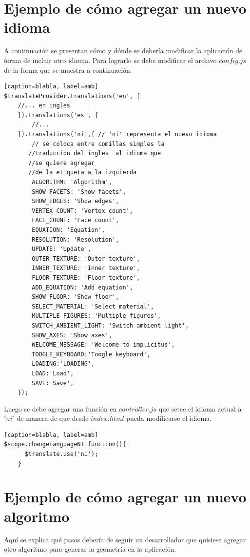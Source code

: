 \documentclass[12pt]{article}
\begin{document}
\section{Ejemplo de cómo agregar un nuevo idioma}
A continuación se presentan cómo y dónde se debería modificar la aplicación de forma de incluir otro idioma. 
Para lograrlo se debe modificar el archivo $config.js$ de la forma que se muestra a continuación.
\begin{lstlisting}[frame=single][caption=blabla, label=amb]
$translateProvider.translations('en', {
   	//... en ingles  
    }).translations('es', {
        //...                 
    }).translations('ni',{ // 'ni' representa el nuevo idioma
        // se coloca entre comillas simples la 
       //traduccion del ingles  al idioma que
       //se quiere agregar
       //de la etiqueta a la izquierda 
        ALGORITHM: 'Algorithm', 
        SHOW_FACETS: 'Show facets',
        SHOW_EDGES: 'Show edges',
        VERTEX_COUNT: 'Vertex count',
        FACE_COUNT: 'Face count',
        EQUATION: 'Equation',
        RESOLUTION: 'Resolution',
        UPDATE: 'Update',
        OUTER_TEXTURE: 'Outer texture',
        INNER_TEXTURE: 'Inner texture',
        FLOOR_TEXTURE: 'Floor texture',
        ADD_EQUATION: 'Add equation',
        SHOW_FLOOR: 'Show floor',
        SELECT_MATERIAL: 'Select material',
        MULTIPLE_FIGURES: 'Multiple figures',
        SWITCH_AMBIENT_LIGHT: 'Switch ambient light',
        SHOW_AXES: 'Show axes',
        WELCOME_MESSAGE: 'Welcome to implicitus',
        TOOGLE_KEYBOARD:'Toogle keyboard',
        LOADING:'LOADING',
        LOAD:'Load',
        SAVE:'Save', 
    });
\end{lstlisting}

Luego se debe agregar una función en $controller.js$ que setee el idioma actual a $'ni'$ de manera de que desde $index.html$ pueda modificarse el idioma.
\begin{lstlisting}[frame=single][caption=blabla, label=amb]
$scope.changeLanguageNI=function(){
      $translate.use('ni');
    }
\end{lstlisting}
\clearpage
\null\newpage
\section{Ejemplo de cómo agregar un nuevo algoritmo}

Aquí se explica qué pasos debería de seguir un desarrollador que quisiese agregar otro algoritmo para generar la geometría en la aplicación.
\end{document}
